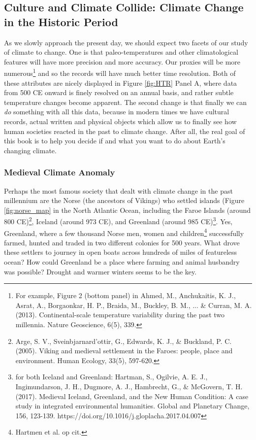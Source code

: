 \subsection{Culture and Climate Collide: Climate Change in the Historic Period}
As we slowly approach the present day, we should expect two facets of our study of climate to change. One is that paleo-temperatures and other climatological features will have more precision and more accuracy. Our proxies will be more numerous\footnote{For example, Figure 2 (bottom panel) in Ahmed, M., Anchukaitis, K. J., Asrat, A., Borgaonkar, H. P., Braida, M., Buckley, B. M., ... \& Curran, M. A. (2013). Continental-scale temperature variability during the past two millennia. Nature Geoscience, 6(5), 339.} and so the records will have much better time resolution. Both of these attributes are nicely displayed in Figure \ref{fig:HTR} Panel A, where data from 500 CE onward is finely resolved on an annual basis, and rather subtle temperature changes become apparent. The second change is that finally we can \emph{do} something with all this data, because in modern times we have cultural records, actual written and physical objects which allow us to finally see how human societies reacted in the past to climate change. After all, the real goal of this book is to help you decide if and what you want to do about Earth's changing climate.

\subsubsection{Medieval Climate Anomaly}
Perhaps the most famous society that dealt with climate change in the past millennium are the Norse (the ancestors of Vikings) who settled islands (Figure \ref{fig:norse_map} in the North Atlantic Ocean, including the Faroe Islands (around 800 CE)\footnote{Arge, S. V., Sveinbjarnard'ottir, G., Edwards, K. J., \& Buckland, P. C. (2005). Viking and medieval settlement in the Faroes: people, place and environment. Human Ecology, 33(5), 597-620.}, Iceland (around 973 CE), and Greenland (around 985 CE)\footnote{for both Iceland and Greenland: Hartman, S., Ogilvie, A. E. J., Ingimundarson, J. H., Dugmore, A. J., Hambrecht, G., \& McGovern, T. H. (2017). Medieval Iceland, Greenland, and the New Human Condition: A case study in integrated environmental humanities. Global and Planetary Change, 156, 123-139. https://doi.org/10.1016/j.gloplacha.2017.04.007
}. Yes, Greenland, where a few thousand Norse men, women and children\footnote{Hartmen et al. op cit.} successfully farmed, hunted and traded in two different colonies for 500 years. What drove these settlers to journey in open boats across hundreds of miles of featureless ocean? How could Greenland be a place where farming and animal husbandry was possible? Drought and warmer winters seems to be the key.\\

